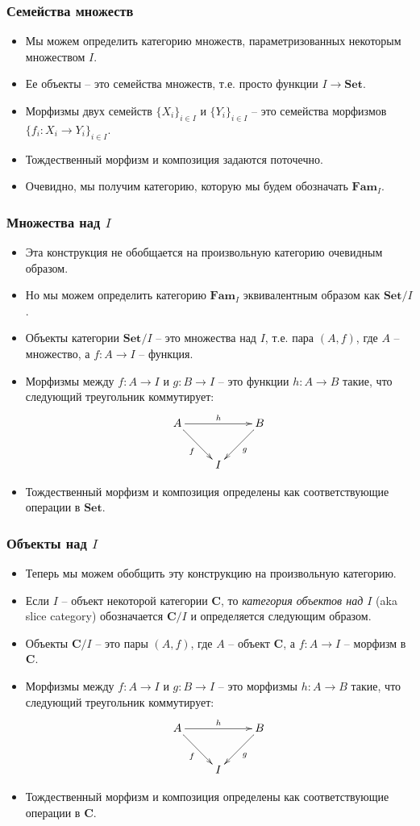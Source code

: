 \documentclass{beamer}
\theoremstyle{definition}
\newcommand{\cat}[1]{\mathbf{#1}}
\renewcommand{\C}{\cat{C}}
\newcommand{\Set}{\cat{Set}}
\begin{document}
\begin{frame}
\frametitle{Семейства множеств}
\begin{itemize}
\item Мы можем определить категорию множеств, параметризованных некоторым множеством $I$.
\item Ее объекты -- это семейства множеств, т.е. просто функции $I \to \Set$.
\item Морфизмы двух семейств $\{ X_i \}_{i \in I}$ и $\{ Y_i \}_{i \in I}$ -- это семейства морфизмов $\{ f_i : X_i \to Y_i \}_{i \in I}$.
\item Тождественный морфизм и композиция задаются поточечно.
\item Очевидно, мы получим категорию, которую мы будем обозначать $\cat{Fam}_I$.
\end{itemize}
\end{frame}

\begin{frame}
\frametitle{Множества над $I$}
\begin{itemize}
\item Эта конструкция не обобщается на произвольную категорию очевидным образом.
\item Но мы можем определить категорию $\cat{Fam}_I$ эквивалентным образом как $\Set/I$.
\item Объекты категории $\Set/I$ -- это множества над $I$, т.е. пара $(A,f)$, где $A$ -- множество, а $f : A \to I$ -- функция.
\item Морфизмы между $f : A \to I$ и $g : B \to I$ -- это функции $h : A \to B$ такие, что следующий треугольник коммутирует:
\[ \xymatrix{ A \ar[rd]_f \ar[rr]^h &   & B \ar[ld]^g \\
                                    & I
            } \]
\item Тождественный морфизм и композиция определены как соответствующие операции в $\Set$.
\end{itemize}
\end{frame}

\begin{frame}
\frametitle{Объекты над $I$}
\begin{itemize}
\item Теперь мы можем обобщить эту конструкцию на произвольную категорию.
\item Если $I$ -- объект некоторой категории $\C$, то \emph{категория объектов над $I$} (aka slice category) обозначается $\C/I$ и определяется следующим образом.
\item Объекты $\C/I$ -- это пары $(A,f)$, где $A$ -- объект $\C$, а $f : A \to I$ -- морфизм в $\C$.
\item Морфизмы между $f : A \to I$ и $g : B \to I$ -- это морфизмы $h : A \to B$ такие, что следующий треугольник коммутирует:
\[ \xymatrix{ A \ar[rd]_f \ar[rr]^h &   & B \ar[ld]^g \\
                                    & I
            } \]
\item Тождественный морфизм и композиция определены как соответствующие операции в $\C$.
\end{itemize}
\end{frame}
\end{document}

